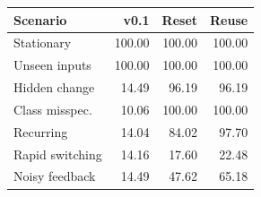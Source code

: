 \begin{tabular}{lrrr}
\toprule
Scenario & v0.1 & Reset & Reuse \\
\midrule
Stationary & 100.00 & 100.00 & 100.00 \\
Unseen inputs & 100.00 & 100.00 & 100.00 \\
Hidden change & 14.49 & 96.19 & 96.19 \\
Class misspec. & 10.06 & 100.00 & 100.00 \\
Recurring & 14.04 & 84.02 & 97.70 \\
Rapid switching & 14.16 & 17.60 & 22.48 \\
Noisy feedback & 14.49 & 47.62 & 65.18 \\
\bottomrule
\end{tabular}
